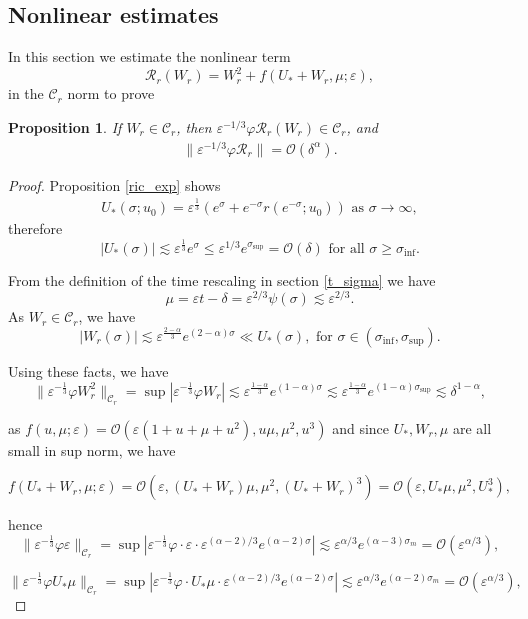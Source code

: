 \documentclass[letterpaper,11pt]{article}
\newcommand{\rmO}{\mathcal{O}}
\newcommand{\eps}{\varepsilon}
\newcommand{\lar}{ \lesssim }
\numberwithin{equation}{section}
\theoremstyle{plain}
\newtheorem{proposition}[theorem]{Proposition}
\begin{document}
\subsection{Nonlinear estimates}

In this section we estimate the nonlinear term
\[
\mathcal{R}_r(W_r) = W_r^2 + f(U_*+W_r, \mu ; \eps),
\]
in the $\mathcal{C}_r$ norm to prove 
\begin{proposition}\label{nl_est_r}
If $W_r \in \mathcal{C}_{r}$, then $\eps^{-1/3}\varphi \mathcal{R}_r(W_r) \in \mathcal{C}_{r}$, and
\begin{align}
\|\eps^{-1/3}\varphi \mathcal{R}_r \| = \rmO(\delta^{\alpha}).
\end{align}
\end{proposition}
\begin{proof}

Proposition \ref{ric_exp} shows
\begin{align*}
U_*(\sigma;u_0) =  \eps^{\frac{1}{3}}(e^\sigma+e^{-\sigma} r(e^{-\sigma}; u_0)   ) \text{ as }\sigma \to \infty,
\end{align*}
therefore 
\[
|U_*(\sigma)| \lar \eps^{\frac{1}{3}}e^\sigma \le \eps^{1/3}e^{\sigma_{\sup}} = \rmO(\delta) \text{ for all } \sigma \ge \sigma_{\inf}.
\]

From the definition of the time rescaling in section \ref{t_sigma} we have
\[
\mu = \eps t-\delta  =\eps^{2/3}\psi(\sigma) \lar \eps^{2/3}.
\]
As $W_r \in \mathcal{C}_r$, we have 
\[
|W_r(\sigma)| \lar \eps^{\frac{2-\alpha}{3}} e^{(2-\alpha)\sigma} \ll U_*(\sigma), \text{ for } \sigma \in (\sigma_{\inf}, \sigma_{\sup}).
\]

Using these facts, we have
\[
\|\eps^{-\frac{1}{3}}\varphi W_r^2\|_{\mathcal{C}_r}=\sup |\eps^{-\frac{1}{3}} \varphi W_r| \lar \eps^{\frac{1-\alpha}{3}} e^{(1-\alpha)\sigma} \lar \eps^{\frac{1-\alpha}{3}} e^{(1-\alpha)\sigma_{\sup}} \lar \delta^{1-\alpha},
\]

as $f(u,\mu; \eps) = \rmO(\eps(1+u+\mu+u^2),u\mu,\mu^2,u^3)$ and since $U_*,W_r,\mu$ are all small in sup norm, we have

\[
f(U_*+W_r, \mu ;\eps) = \rmO(\eps, (U_*+W_r)\mu, \mu^2, (U_*+W_r)^3 ) = \rmO(\eps, U_*\mu, \mu^2, U_*^3),
\]

hence
\[
\|\eps^{-\frac{1}{3}}\varphi \eps \|_{\mathcal{C}_r}=\sup |\eps^{-\frac{1}{3}} \varphi  \cdot \eps \cdot \eps^{(\alpha-2)/3}e^{(\alpha-2)\sigma}| \lar \eps^{\alpha/3} e^{(\alpha-3)\sigma_m} = \rmO(\eps^{\alpha/3}) ,
\]

\[
\|\eps^{-\frac{1}{3}}\varphi U_*\mu \|_{\mathcal{C}_r} =\sup |\eps^{-\frac{1}{3}} \varphi \cdot U_*\mu \cdot \eps^{(\alpha-2)/3}e^{(\alpha-2)\sigma} | \lar \eps^{\alpha/3} e^{(\alpha-2)\sigma_m}  =\rmO( \eps^{\alpha/3}) ,
\]


\end{proof}
\end{document}
